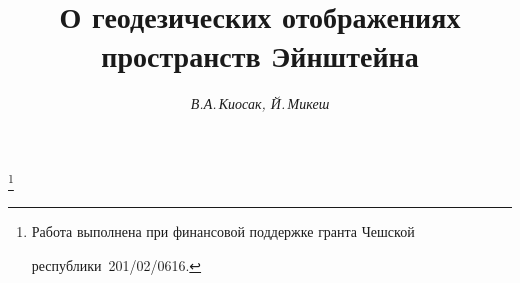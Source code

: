 




%





\newcommand{\const}{\operatorname{const}}


\newcommand{\sh}{\operatorname{sh}}


\newcommand{\vn}{$V_n$}


\newcommand{\vnn}{$\ov V_n$}


\newcommand{\vnb}{$V_n(B)$}


\newcommand{\mr}{\leq}


\newcommand{\nr}{\ne}


\newcommand{\rang}{\operatorname{rang}}


\renewcommand{\a}{\alpha}


\renewcommand{\b}{\beta}


\newcommand{\tts}[1]{}







\setcounter{page}{36}















\author{\it В.А.\,Киосак, Й.\,Микеш}




\title{О геодезических отображениях пространств Эйнштейна}


\thanks{Работа выполнена при финансовой поддержке гранта Чешской


республики \No\,201/02/0616.}





